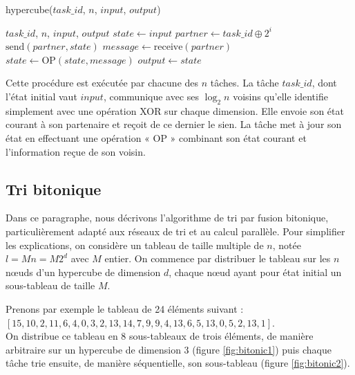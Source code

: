 \begin{algorithm}
\caption{hypercube($task\_id$, $n$, $input$, $output$)}
\begin{algorithmic}
\REQUIRE $task\_id$, $n$, $input$, $output$
\STATE $state \leftarrow input$
\STATE $partner \leftarrow task\_id \oplus 2^i$
\STATE $\text{send}(partner, state)$
\STATE $message \leftarrow \text{receive}(partner)$
\STATE $state \leftarrow \text{OP}(state, message)$
\ENDFOR
\STATE $output \leftarrow state$
\end{algorithmic}
\end{algorithm}

Cette procédure est exécutée par chacune des $n$ tâches. La tâche $task\_id$, dont l'état initial vaut $input$, communique avec ses $\log_2 n$ voisins qu'elle identifie simplement avec une opération XOR sur chaque dimension. Elle envoie son état courant à son partenaire et reçoit de ce dernier le sien. La tâche met à jour son état en effectuant une opération « OP » combinant son état courant et l'information reçue de son voisin.

\subsection{Tri bitonique}

Dans ce paragraphe, nous décrivons l'algorithme de tri par fusion bitonique, particulièrement adapté aux réseaux de tri et au calcul parallèle. Pour simplifier les explications, on considère un tableau de taille multiple de $n$, notée $l = Mn = M2^d$ avec $M$ entier. On commence par distribuer le tableau sur les $n$ nœuds d'un hypercube de dimension $d$, chaque nœud ayant pour état initial un sous-tableau de taille $M$.

Prenons par exemple le tableau de 24 éléments suivant :\\
 $[15, 10, 2, 11, 6, 4, 0, 3, 2, 13, 14, 7, 9, 9, 4, 13, 6, 5, 13, 0, 5, 2, 13, 1]$.\\ On distribue ce tableau en 8 sous-tableaux de trois éléments, de manière arbitraire sur un hypercube de dimension 3 (figure \ref{fig:bitonic1}) puis chaque tâche trie ensuite, de manière séquentielle, son sous-tableau (figure \ref{fig:bitonic2}).

